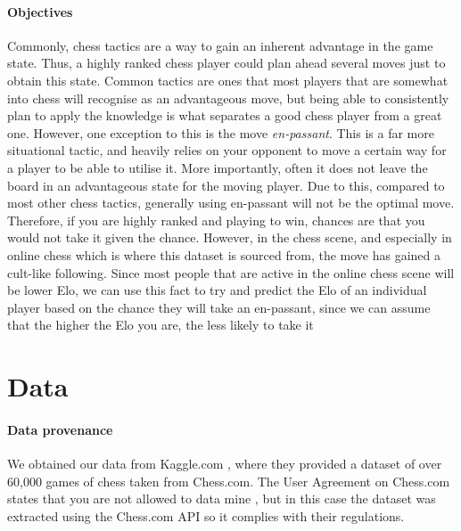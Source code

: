 \documentclass[10pt,a4paper,twocolumn]{article}
\begin{document}
\paragraph{Objectives}

Commonly, chess tactics are a way to gain an inherent advantage in the game state. Thus, a highly ranked chess player could plan ahead several moves just to obtain this state. Common tactics are ones that most players that are somewhat into chess will recognise as an advantageous move, but being able to consistently plan to apply the knowledge is what separates a good chess player from a great one. However, one exception to this is the move \textit{en-passant}. This is a far more situational tactic, and heavily relies on your opponent to move a certain way for a player to be able to utilise it. More importantly, often it does not leave the board in an advantageous state for the moving player. Due to this, compared to most other chess tactics, generally using en-passant will not be the optimal move. Therefore, if you are highly ranked and playing to win, chances are that you would not take it given the chance. However, in the chess scene, and especially in online chess which is where this dataset is sourced from, the move has gained a cult-like following. Since most people that are active in the online chess scene will be lower Elo, we can use this fact to try and predict the Elo of an individual player based on the chance they will take an en-passant, since we can assume that the higher the Elo you are, the less likely to take it

\section{Data}


\paragraph{Data provenance}
We obtained our data from Kaggle.com \cite{Kaggle}, where they provided a dataset of over 60,000 games of chess taken from Chess.com. The User Agreement on Chess.com states that you are not allowed to data mine \cite{ChessT&C}, but in this case the dataset was extracted using the Chess.com API so it complies with their regulations.
\end{document}
